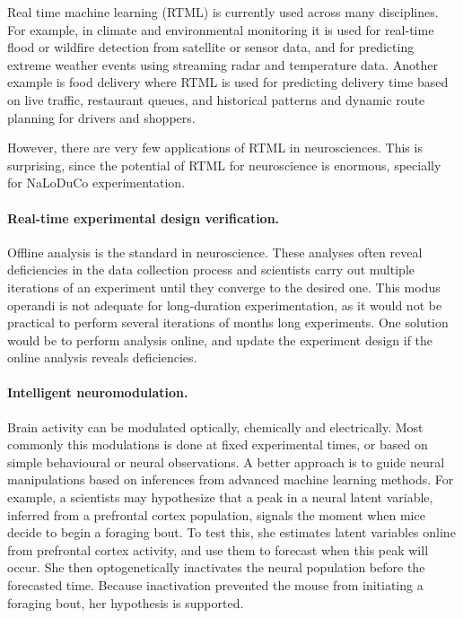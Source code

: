 

Real time machine learning (RTML) is currently used across many disciplines.
%
For example, in climate and environmental monitoring it is used for real-time
flood or wildfire detection from satellite or sensor data, and for predicting
extreme weather events using streaming radar and temperature data.
%
Another example is food delivery where RTML is used for predicting delivery
time based on live traffic, restaurant queues, and historical patterns and
dynamic route planning for drivers and shoppers.


However, there are very few applications of RTML in neurosciences. This is
surprising, since the potential of RTML for neuroscience is enormous, specially
for NaLoDuCo experimentation.

\paragraph{Real-time experimental design verification.}
Offline analysis is the standard in neuroscience. These analyses
often reveal deficiencies in the data collection process and scientists carry
out multiple iterations of an experiment until they converge to the desired
one.
%
This modus operandi is not adequate for long-duration experimentation, as it
would not be practical to perform several iterations of months long
experiments. One solution would be to perform analysis online, and update the
experiment design if the online analysis reveals deficiencies.

\paragraph{Intelligent neuromodulation.}
%
Brain activity can be modulated optically, chemically and electrically.
%
Most commonly this modulations is done at fixed experimental times, or based on
simple behavioural or neural observations.
%
A better approach is to guide neural manipulations based on inferences from
advanced machine learning methods.
%
For example, a scientists may hypothesize that a peak in a neural latent
variable, inferred from a prefrontal cortex population, signals the moment when
mice decide to begin a foraging bout.  To test this, she estimates latent
variables online from prefrontal cortex activity, and use them to forecast when
this peak will occur. She then optogenetically inactivates the neural
population before the forecasted time.  Because inactivation prevented the
mouse from initiating a foraging bout, her hypothesis is supported.

